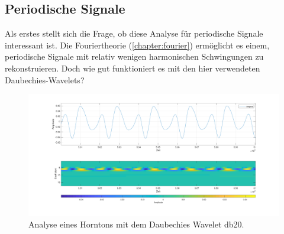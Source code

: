 \begin{refsection}
\subsection{Periodische Signale}
Als erstes stellt sich die Frage, ob diese Analyse für periodische Signale interessant ist.
Die Fouriertheorie (\autoref{chapter:fourier}) ermöglicht es einem, periodische Signale mit relativ wenigen harmonischen Schwingungen zu rekonstruieren.
Doch wie gut funktioniert es mit den hier verwendeten Daubechies-Wavelets?

\begin{figure}
	\centering
	\includegraphics[width=\linewidth]{papers/compress/Bilder/frenchHorn_normal.pdf}
	\caption{Analyse eines Horntons mit dem Daubechies Wavelet db20.}
	\label{fig:horn}
\end{figure}


\end{refsection}
